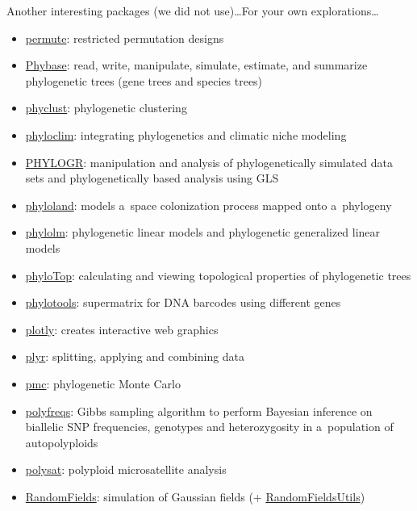 \documentclass[compress, ucs, xelatex, 11pt, xcolor=svgnames, aspectratio=169,
	hyperref={
		bookmarks=true,
		unicode=true,
		colorlinks=true,
		pdftitle={Molecular data in R},
		plainpages=false,
		pdfauthor={Vojtech Zeisek},
		pdfsubject={Course about phylogeny and evolution in R},
		pdfcreator={XeLaTeX},
		pdfkeywords={R, evolution, phylogeny, molecular data},
		linkcolor=Crimson, %
		anchorcolor=Magenta, %
		citecolor=Magenta, %
		filecolor=Magenta, %
		menucolor=Magenta, %
		urlcolor=DodgerBlue, %
		pdftex},
	url={hyphens, lowtilde} %
	]{beamer}
\begin{document}
\begin{frame}[allowframebreaks]{Another interesting packages (we did not use)\ldots}{For your own explorations\ldots}
\begin{itemize}
		\item \href{https://CRAN.R-project.org/package=permute}{permute}: restricted permutation designs
		\item \href{https://github.com/lliu1871/phybase}{Phybase}: read, write, manipulate, simulate, estimate, and summarize phylogenetic trees (gene trees and species trees)
		\item \href{https://CRAN.R-project.org/package=phyclust}{phyclust}: phylogenetic clustering
		\item \href{https://CRAN.R-project.org/package=phyloclim}{phyloclim}: integrating phylogenetics and climatic niche modeling
		\item \href{https://CRAN.R-project.org/package=PHYLOGR}{PHYLOGR}: manipulation and analysis of phylogenetically simulated data sets and phylogenetically based analysis using GLS
		\item \href{https://CRAN.R-project.org/package=phyloland}{phyloland}: models a~space colonization process mapped onto a~phylogeny
		\item \href{https://CRAN.R-project.org/package=phylolm}{phylolm}: phylogenetic linear models and phylogenetic generalized linear models
		\item \href{https://CRAN.R-project.org/package=phyloTop}{phyloTop}: calculating and viewing topological properties of phylogenetic trees
		\item \href{https://CRAN.R-project.org/package=phylotools}{phylotools}: supermatrix for DNA barcodes using different genes
		\item \href{https://CRAN.R-project.org/package=plotly}{plotly}: creates interactive web graphics
		\item \href{https://CRAN.R-project.org/package=plyr}{plyr}: splitting, applying and combining data
		\item \href{https://CRAN.R-project.org/package=pmc}{pmc}: phylogenetic Monte Carlo
		\item \href{https://CRAN.R-project.org/package=polyfreqs}{polyfreqs}: Gibbs sampling algorithm to perform Bayesian inference on biallelic SNP frequencies, genotypes and heterozygosity in a~population of autopolyploids
		\item \href{https://CRAN.R-project.org/package=polysat}{polysat}: polyploid microsatellite analysis
		\item \href{https://CRAN.R-project.org/package=RandomFields}{RandomFields}: simulation of Gaussian fields (+ \href{https://CRAN.R-project.org/package=RandomFieldsUtils}{RandomFieldsUtils})

\end{itemize}
\end{frame}
\end{document}
